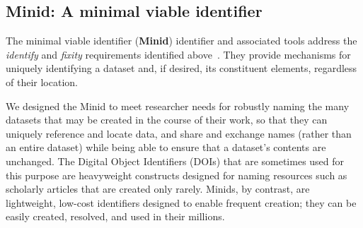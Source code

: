 \documentclass[11pt]{article}
\begin{document}






\subsection{Minid: A minimal viable identifier}

The minimal viable identifier (\textbf{Minid}) identifier and associated tools address the \emph{identify} and \emph{fixity} requirements
identified above~\cite{chard16}.
They provide mechanisms for uniquely identifying a dataset and, if desired, its constituent elements, 
regardless of their location.

We designed the Minid to meet researcher needs
for robustly naming the many datasets that may be created in the course of their work, 
so that they can uniquely reference and locate data,
and share and exchange names (rather than an entire dataset) 
while being able to ensure that a dataset's contents are unchanged.
The Digital Object Identifiers (DOIs) that are sometimes used for this purpose
are heavyweight constructs designed for naming resources such as scholarly articles
that are created only rarely.
Minids, by contrast, are lightweight, low-cost identifiers designed to enable frequent creation;
they can be easily created, resolved, and used in their millions. 
\end{document}
